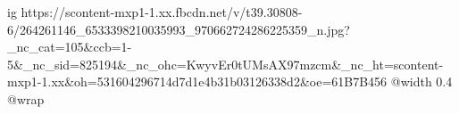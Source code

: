  
 
 
 
 

\ifcmt
  ig https://scontent-mxp1-1.xx.fbcdn.net/v/t39.30808-6/264261146_6533398210035993_970662724286225359_n.jpg?_nc_cat=105&ccb=1-5&_nc_sid=825194&_nc_ohc=KwyvEr0tUMsAX97mzcm&_nc_ht=scontent-mxp1-1.xx&oh=531604296714d7d1e4b31b03126338d2&oe=61B7B456
  @width 0.4
  @wrap 
\fi
